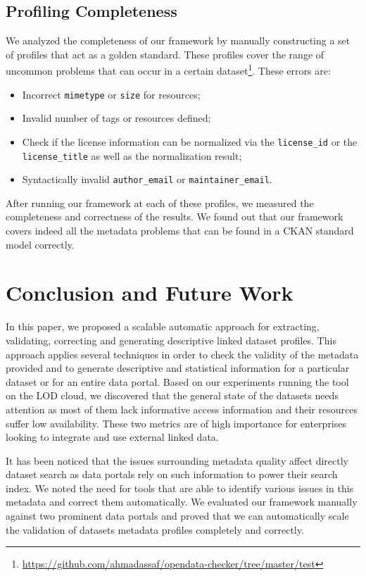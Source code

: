\documentclass[runningheads,a4paper]{llncs}
\begin{document}
\subsection{Profiling Completeness}
We analyzed the completeness of our framework by manually constructing a set of profiles that act as a golden standard. These profiles cover the range of uncommon problems that can occur in a certain dataset\footnote{\url{https://github.com/ahmadassaf/opendata-checker/tree/master/test}}. These errors are:
\begin{itemize}
 \item Incorrect \texttt{mimetype} or \texttt{size} for resources;
 \item Invalid number of tags or resources defined;
 \item Check if the license information can be normalized via the \texttt{license\_id} or the \texttt{license\_title} as well as the normalization result;
 \item Syntactically invalid \texttt{author\_email} or \texttt{maintainer\_email}.
\end{itemize}

After running our framework at each of these profiles, we measured the completeness and correctness of the results. We found out that our framework covers indeed all the metadata problems that can be found in a CKAN standard model correctly.


\section{Conclusion and Future Work}
\label{sec:conclusion}
In this paper, we proposed a scalable automatic approach for extracting, validating, correcting and generating descriptive linked dataset profiles. This approach applies several techniques in order to check the validity of the metadata provided and to generate descriptive and statistical information for a particular dataset or for an entire data portal. Based on our experiments running the tool on the LOD cloud, we discovered that the general state of the datasets needs attention as most of them lack informative access information and their resources suffer low availability. These two metrics are of high importance for enterprises looking to integrate and use external linked data.

It has been noticed that the issues surrounding metadata quality affect directly dataset search as data portals rely on such information to power their search index. We noted the need for tools that are able to identify various issues in this metadata and correct them automatically. We evaluated our framework manually against two prominent data portals and proved that we can automatically scale the validation of datasets metadata profiles completely and correctly.
\end{document}
